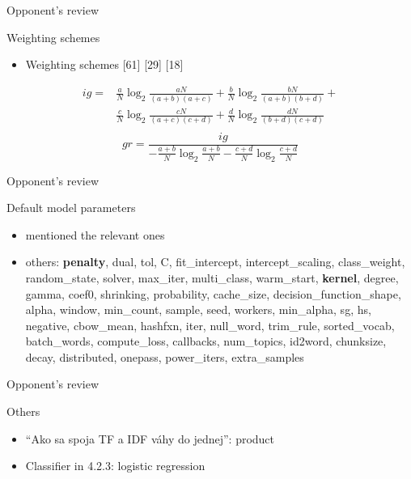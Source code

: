 \documentclass[xcolor={table}]{beamer}
\begin{document}
\begin{frame}{Opponent's review}
    \begin{block}{Weighting schemes}
        \begin{itemize}   
            \item Weighting  schemes [61] [29] [18]
        \end{itemize}
    \end{block}
    
    \begin{align*}
        ig = &\frac{a}{N}\log_2{\frac{aN}{(a+b)(a+c)}} + \frac{b}{N}\log_2{\frac{bN}{(a+b)(b+d)}} + \\ &\frac{c}{N}\log_2{\frac{cN}{(a+c)(c+d)}} + \frac{d}{N}\log_2{\frac{dN}{(b+d)(c+d)}} \\
    \end{align*}
    $$gr=\frac{ig}{-\frac{a+b}{N}\log_2{\frac{a+b}{N}} - \frac{c+d}{N}\log_2{\frac{c+d}{N}}}$$
    
    
\end{frame} 

\begin{frame}{Opponent's review}
    \begin{block}{Default model parameters}
        \begin{itemize}   
            \item mentioned the relevant ones
            \item others: \textbf{penalty}, dual, tol, C, fit\_intercept, intercept\_scaling, class\_weight, random\_state, solver, max\_iter, multi\_class, warm\_start, \textbf{kernel}, degree, gamma, coef0, shrinking, probability, cache\_size, decision\_function\_shape, alpha, window, min\_count, sample, seed, workers, min\_alpha, sg, hs, negative, cbow\_mean, hashfxn, iter, null\_word, trim\_rule, sorted\_vocab, batch\_words, compute\_loss, callbacks, num\_topics, id2word, chunksize, decay, distributed, onepass, power\_iters, extra\_samples
        \end{itemize}
    \end{block}
\end{frame} 

\begin{frame}{Opponent's review}
    \begin{block}{Others}
        \begin{itemize}   
            \item ``Ako sa spoja TF a IDF váhy do jednej'': product
            \item Classifier in 4.2.3: logistic regression %
        \end{itemize}
    \end{block}
\end{frame} 
\end{document}
